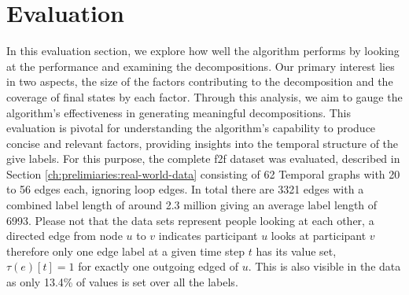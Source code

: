 
\chapter{Evaluation}
\label{ch:Evaluation}

In this evaluation section, we explore how well the algorithm performs by looking at the performance and examining the decompositions. Our primary interest lies in two aspects, the size of the factors contributing to the decomposition and the coverage of final states by each factor. Through this analysis, we aim to gauge the algorithm's effectiveness in generating meaningful decompositions. This evaluation is pivotal for understanding the algorithm's capability to produce concise and relevant factors, providing insights into the temporal structure of the give labels. For this purpose, the complete f2f dataset was evaluated, described in Section \ref{ch:prelimiaries:real-world-data} consisting of 62 Temporal graphs with 20 to 56 edges each, ignoring loop edges. In total there are 3321 edges with a combined label length of around 2.3 million giving an average label length of 6993. Please not that the data sets represent people looking at each other, a directed edge from node $u$ to $v$ indicates participant $u$ looks at participant $v$ therefore only one edge label at a given time step $t$ has its value set, $\tau(e)[t] = 1$ for exactly one outgoing edged of $u$. This is also visible in the data as only 13.4\% of values is set over all the labels.

